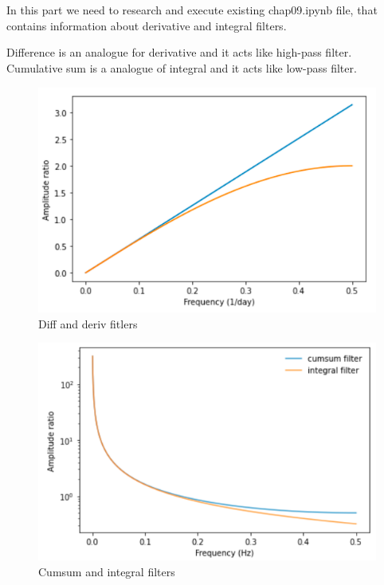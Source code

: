 \documentclass[a4paper]{article}
\begin{document}
        In this part we need to research and execute existing chap09.ipynb file, that contains information about derivative and integral filters.
        
        Difference is an analogue for derivative and it acts like high-pass filter. Cumulative sum is a analogue of integral and it acts like low-pass filter.
        
        \begin{figure}[H]
            \centering
            \includegraphics[width=\textwidth]{img/p1_1.png}
            \caption{Diff and deriv fitlers}
            \label{fig:p1_2}
        \end{figure}
        
        \begin{figure}[H]
            \centering
            \includegraphics[width=\textwidth]{img/p1_2.png}
            \caption{Cumsum and integral filters}
            \label{fig:p1_2}
        \end{figure}
        
\end{document}
